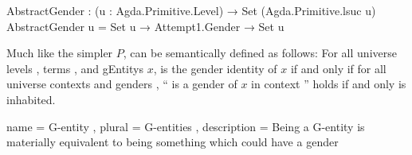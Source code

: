 \documentclass{article}
\begin{document}
\begin{code}
  AbstractGender : (u : Agda.Primitive.Level) → Set (Agda.Primitive.lsuc u)
  AbstractGender u = Set u → Attempt1.Gender → Set u
\end{code}

Much like the simpler \(P\),  can be semantically defined as follows: For all universe levels ,   terms , and \glspl{gEntity} \(x\),  is the gender identity of \(x\) if and only if for all universe contexts  and genders , `` is a gender of \(x\) in context '' holds if and only    is inhabited.

\printbibliography{}

  { name = {G-entity}
  , plural = {G-entities}
  , description = Being a G-entity is materially equivalent to being something which could have a gender
  }

\printglossary{}
\end{document}
